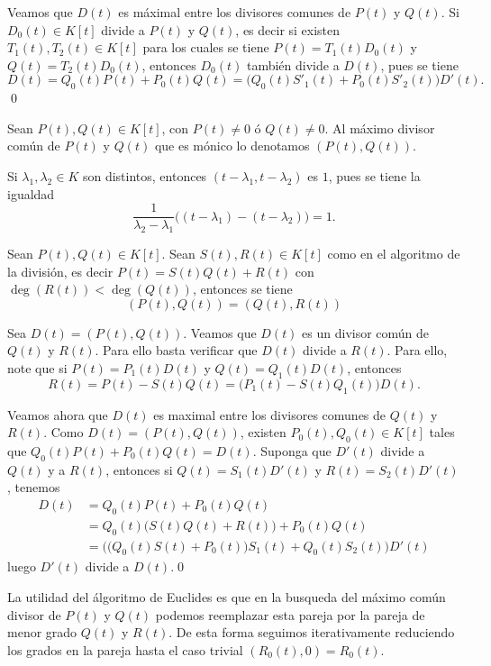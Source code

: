 Veamos que $D(t)$ es m\'aximal entre los divisores comunes de $P(t)$ y $Q(t)$. Si $D_0(t)\in K[t]$ divide a $P(t)$ y $Q(t)$, es decir si existen
$T_1(t),T_2(t)\in K[t]$ para los cuales se tiene $P(t)=T_1(t)D_0(t)$ y $Q(t)=T_2(t)D_0(t)$, entonces $D_0(t)$ tambi\'en divide a $D(t)$, pues se tiene
\[
D(t)=Q_0(t)P(t)+P_0(t)Q(t)=\Big(Q_0(t)S'_1(t)+P_0(t)S'_2(t)\Big)D'(t).
\]
\qed

\begin{nota}
Sean $P(t),Q(t)\in K[t]$, con $P(t)\ne 0$ \'o $Q(t)\ne 0$. Al m\'aximo divisor com\'un de $P(t)$ y $Q(t)$ que es m\'onico lo denotamos $(P(t),Q(t))$.
\end{nota}

\begin{obs}
Si $\lambda_1,\lambda_2\in K$ son distintos, entonces $(t-\lambda_1,t-\lambda_2)$ es $1$, pues se tiene la igualdad
\[
\frac{1}{\lambda_2-\lambda_1}\Big( (t-\lambda_1)-(t-\lambda_2) \Big)=1.
\]
\end{obs}

\begin{pro}
Sean $P(t),Q(t)\in K[t]$. Sean $S(t),R(t)\in K[t]$ como en el algoritmo de la divisi\'on, es decir $P(t)=S(t)Q(t)+R(t)$ con $\deg\left(R(t)\right)<\deg\left(Q(t)\right)$, entonces se tiene
$$ (P(t),Q(t))=(Q(t),R(t)) $$
\end{pro}

\dem Sea $D(t)=(P(t),Q(t))$. Veamos que $D(t)$ es un divisor com\'un de $Q(t)$ y $R(t)$. Para ello basta verificar que $D(t)$ divide a $R(t)$. Para ello, note que si $P(t)=P_1(t)D(t)$ y $Q(t)=Q_1(t)D(t)$, entonces $$R(t)=P(t)-S(t)Q(t)=\Big(P_1(t)-S(t)Q_1(t)\Big)D(t).$$

Veamos ahora que $D(t)$ es maximal entre los divisores comunes de $Q(t)$ y $R(t)$. Como $D(t)=(P(t),Q(t))$, existen $P_0(t),Q_0(t)\in K[t]$ tales que $Q_0(t)P(t)+P_0(t)Q(t)=D(t)$.
Suponga que $D'(t)$ divide a $Q(t)$ y a $R(t)$, entonces si $Q(t)=S_1(t)D'(t)$ y $R(t)=S_2(t)D'(t)$, tenemos
\begin{align*}
D(t) & = Q_0(t)P(t)+P_0(t)Q(t)\\
 & =Q_0(t)\Big(S(t)Q(t)+R(t)\Big)+P_0(t)Q(t)\\
 & =\Big(\big(Q_0(t)S(t)+P_0(t)\big)S_1(t)+Q_0(t)S_2(t)\Big)D'(t)
\end{align*}
luego $D'(t)$ divide a $D(t)$.\qed

\begin{obs}
La utilidad del \'algoritmo de Euclides es que en la busqueda del m\'aximo com\'un divisor de $P(t)$ y $Q(t)$ podemos reemplazar esta pareja por la pareja de menor grado $Q(t)$ y $R(t)$. De esta forma seguimos iterativamente reduciendo los grados en la pareja hasta el caso trivial $(R_0(t),0)=R_0(t)$.
\end{obs}

